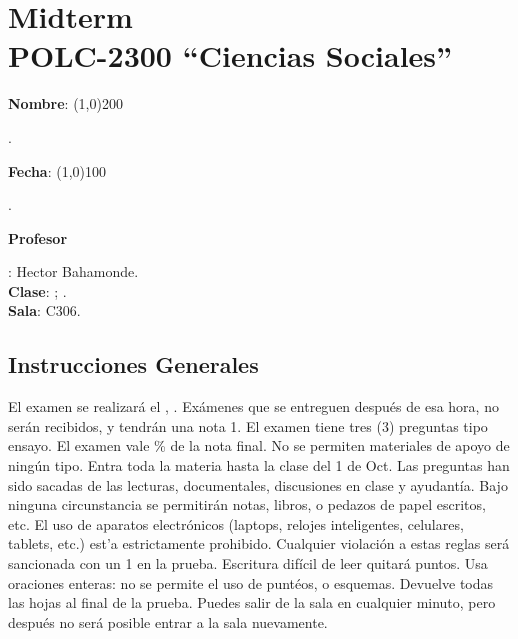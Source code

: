 \documentclass{article}
\begin{document}
{\centering\section*{Midterm\\POLC-2300 ``Ciencias Sociales''}}

{\vspace{.5cm}\raggedright{\bf Nombre}: \line(1,0){200}}. %
{\vspace{.5cm}\hspace{4.5cm}\raggedright{\bf Fecha}: \line(1,0){100}}. %


{\vspace{.5cm}\raggedright \bf Profesor}: Hector Bahamonde.\\
{\bf Clase}: {\unskip}; {\unskip}.\\
{\bf Sala}: C306.


\vspace{0.5cm}\subsection*{Instrucciones Generales}


El examen se realizar\'a el \underline{{\unskip}}, {\unskip}. Ex\'amenes que se entreguen despu\'es de esa hora, no ser\'an recibidos, y tendr\'an una nota 1. El examen tiene tres (3) preguntas tipo ensayo. El examen vale {\unskip}\% de la nota final. No se permiten materiales de apoyo de ning\'un tipo. Entra toda la materia hasta la clase del 1 de Oct. Las preguntas han sido sacadas de las lecturas, documentales, discusiones en clase y ayudant\'ia. Bajo ninguna circunstancia se permitir\'an notas, libros, o pedazos de papel escritos, etc. El uso de aparatos electr\'onicos (laptops, relojes inteligentes, celulares, tablets, etc.) est'a estrictamente prohibido. Cualquier violaci\'on a estas reglas ser\'a sancionada con un 1 en la prueba. Escritura dif\'icil de leer quitar\'a puntos. Usa oraciones enteras: no se permite el uso de punt\'eos, o esquemas. Devuelve todas las hojas al final de la prueba. Puedes salir de la sala en cualquier minuto, pero despu\'es no ser\'a posible entrar a la sala nuevamente.
\end{document}
